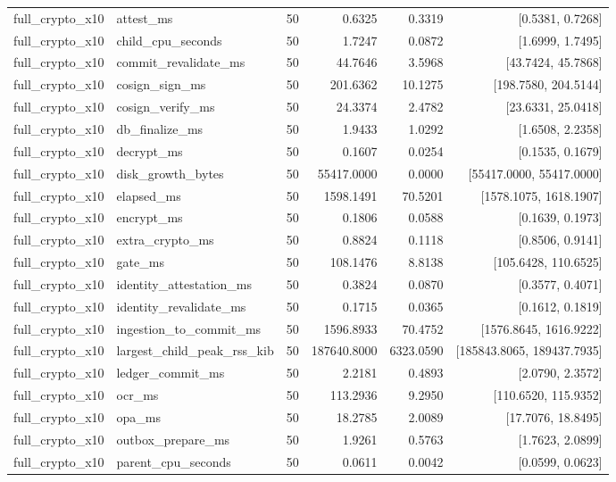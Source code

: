 \begin{tabular}{llrrrr}
full\_crypto\_x10 & attest\_ms & 50 & 0.6325 & 0.3319 & [0.5381, 0.7268] \\
full\_crypto\_x10 & child\_cpu\_seconds & 50 & 1.7247 & 0.0872 & [1.6999, 1.7495] \\
full\_crypto\_x10 & commit\_revalidate\_ms & 50 & 44.7646 & 3.5968 & [43.7424, 45.7868] \\
full\_crypto\_x10 & cosign\_sign\_ms & 50 & 201.6362 & 10.1275 & [198.7580, 204.5144] \\
full\_crypto\_x10 & cosign\_verify\_ms & 50 & 24.3374 & 2.4782 & [23.6331, 25.0418] \\
full\_crypto\_x10 & db\_finalize\_ms & 50 & 1.9433 & 1.0292 & [1.6508, 2.2358] \\
full\_crypto\_x10 & decrypt\_ms & 50 & 0.1607 & 0.0254 & [0.1535, 0.1679] \\
full\_crypto\_x10 & disk\_growth\_bytes & 50 & 55417.0000 & 0.0000 & [55417.0000, 55417.0000] \\
full\_crypto\_x10 & elapsed\_ms & 50 & 1598.1491 & 70.5201 & [1578.1075, 1618.1907] \\
full\_crypto\_x10 & encrypt\_ms & 50 & 0.1806 & 0.0588 & [0.1639, 0.1973] \\
full\_crypto\_x10 & extra\_crypto\_ms & 50 & 0.8824 & 0.1118 & [0.8506, 0.9141] \\
full\_crypto\_x10 & gate\_ms & 50 & 108.1476 & 8.8138 & [105.6428, 110.6525] \\
full\_crypto\_x10 & identity\_attestation\_ms & 50 & 0.3824 & 0.0870 & [0.3577, 0.4071] \\
full\_crypto\_x10 & identity\_revalidate\_ms & 50 & 0.1715 & 0.0365 & [0.1612, 0.1819] \\
full\_crypto\_x10 & ingestion\_to\_commit\_ms & 50 & 1596.8933 & 70.4752 & [1576.8645, 1616.9222] \\
full\_crypto\_x10 & largest\_child\_peak\_rss\_kib & 50 & 187640.8000 & 6323.0590 & [185843.8065, 189437.7935] \\
full\_crypto\_x10 & ledger\_commit\_ms & 50 & 2.2181 & 0.4893 & [2.0790, 2.3572] \\
full\_crypto\_x10 & ocr\_ms & 50 & 113.2936 & 9.2950 & [110.6520, 115.9352] \\
full\_crypto\_x10 & opa\_ms & 50 & 18.2785 & 2.0089 & [17.7076, 18.8495] \\
full\_crypto\_x10 & outbox\_prepare\_ms & 50 & 1.9261 & 0.5763 & [1.7623, 2.0899] \\
full\_crypto\_x10 & parent\_cpu\_seconds & 50 & 0.0611 & 0.0042 & [0.0599, 0.0623] \\

\end{tabular}
